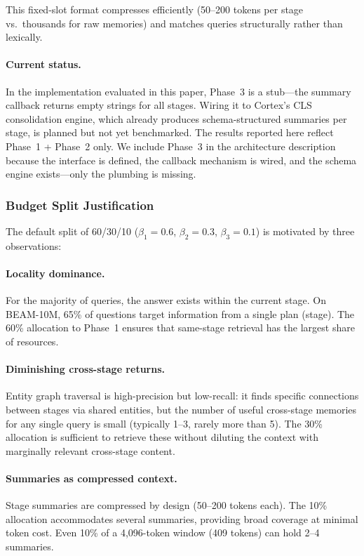 \documentclass[11pt]{article}
\begin{document}
This fixed-slot format compresses efficiently (50--200 tokens per
stage vs.\ thousands for raw memories) and matches queries
structurally rather than lexically.

\paragraph{Current status.}
In the implementation evaluated in this paper, Phase~3 is a stub---the
summary callback returns empty strings for all stages.  Wiring it to
Cortex's CLS consolidation engine, which already produces
schema-structured summaries per stage, is planned but not yet
benchmarked.  The results reported here reflect Phase~1 + Phase~2
only.  We include Phase~3 in the architecture description because the
interface is defined, the callback mechanism is wired, and the schema
engine exists---only the plumbing is missing.

\subsubsection{Budget Split Justification}
\label{sec:budget-split}

The default split of 60/30/10 ($\beta_1 = 0.6$, $\beta_2 = 0.3$,
$\beta_3 = 0.1$) is motivated by three observations:

\paragraph{Locality dominance.}
For the majority of queries, the answer exists within the current
stage.  On BEAM-10M, 65\% of questions target information from a
single plan (stage).  The 60\% allocation to Phase~1 ensures that
same-stage retrieval has the largest share of resources.

\paragraph{Diminishing cross-stage returns.}
Entity graph traversal is high-precision but low-recall: it finds
specific connections between stages via shared entities, but the
number of useful cross-stage memories for any single query is small
(typically 1--3, rarely more than 5).  The 30\% allocation is
sufficient to retrieve these without diluting the context with
marginally relevant cross-stage content.

\paragraph{Summaries as compressed context.}
Stage summaries are compressed by design (50--200 tokens each).  The
10\% allocation accommodates several summaries, providing broad
coverage at minimal token cost.  Even 10\% of a 4,096-token window
(409 tokens) can hold 2--4 summaries.
\end{document}
